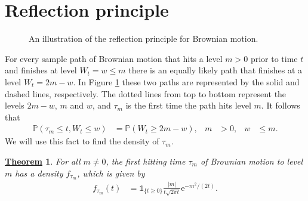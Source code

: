 \documentclass[12pt]{book}
\numberwithin{equation}{chapter}
\theoremstyle{plain}
\newtheorem{theorem}{\underline{Theorem}}
\numberwithin{theorem}{section}
\theoremstyle{definition}
\numberwithin{exercise}{chapter}
\newcommand{\<}{\langle}
\renewcommand{\>}{\rangle}
\renewcommand{\(}{\left(}
\renewcommand{\)}{\right)}
\renewcommand{\[}{\left[}
\renewcommand{\]}{\right]}
\newcommand\Ib{\mathds{1}} 	%
\newcommand\Pb{\mathds{P}}
\newcommand\ee{\mathrm{e}}
\begin{document}

\section{Reflection principle}
\label{sec:reflection}

\begin{figure}
\centering
\caption{An illustration of the reflection principle for Brownian motion.}
\label{fig:ReflectionPinciple}
\end{figure}

For every sample path of Brownian motion that hits a level $m>0$ prior to time $t$ and finishes at level $W_t = w \leq m$ there is an equally likely path that finishes at a level $W_t = 2 m - w$.  In Figure \ref{fig:ReflectionPinciple} these two paths are represented by the solid and dashed lines, respectively.  The dotted lines from top to bottom represent the levels $2 m - w$, $m$ and $w$, and $\tau_m$ is the first time the path hits level $m$.
It follows that
\begin{align}
\Pb( \tau_m \leq t , W_t \leq w )
	&=	\Pb( W_t \geq 2m-w) , &
m
	&>	0 , &
w
	&\leq m . \label{eq:ReflectionPrinciple}
\end{align}
We will use this fact to find the density of $\tau_m$.

\begin{theorem}
For all $m \neq 0$, the first hitting time $\tau_m$ of Brownian motion to level $m$ has a density $f_{\tau_m}$, which is given by
\begin{align}
f_{\tau_m}(t)
	&=	\Ib_{\{ t \geq 0 \}}\frac{|m|}{t\sqrt{2\pi t}}\ee^{-m^2/(2t)} . \label{eq:tau.m.density}
\end{align}
\end{theorem}
\end{document}
